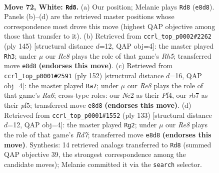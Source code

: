 \documentclass[11pt]{article}
\begin{document}
\clearpage

\begin{figure}[p]\centering
\begin{subfigure}{0.46\textwidth}\centering
\resizebox{\linewidth}{!}{%
\newchessgame
\chessboard[
  setfen={4R3/1r4bk/8/R7/2P5/8/2N3K1/8 w - - 64 72},
  showmover=false,
  pgfstyle=straightmove, color=movearrow, markmove={e8-d8}
]}
\caption{}
\end{subfigure}\hfill
\begin{subfigure}{0.46\textwidth}\centering
\resizebox{\linewidth}{!}{%
\newchessgame
\chessboard[
  setfen={8/8/8/1n2k3/7r/3KB3/R7/8 b - - 0 73},
  showmover=false,
  pgfstyle=straightmove, color=movearrow, markmove={h4-h3}
]}
\caption{}
\end{subfigure}
\\[4pt]
\begin{subfigure}{0.46\textwidth}\centering
\resizebox{\linewidth}{!}{%
\newchessgame
\chessboard[
  setfen={8/4bk2/R7/5p1K/5P2/8/8/8 w - - 46 77},
  showmover=false,
  pgfstyle=straightmove, color=movearrow, markmove={a6-a7}
]}
\caption{}
\end{subfigure}\hfill
\begin{subfigure}{0.46\textwidth}\centering
\resizebox{\linewidth}{!}{%
\newchessgame
\chessboard[
  setfen={8/5R2/8/4k1K1/6B1/1r6/3r4/8 b - - 5 67},
  showmover=false,
  pgfstyle=straightmove, color=movearrow, markmove={d2-g2}
]}
\caption{}
\end{subfigure}
\caption{\textbf{Move 72, White: \texttt{Rd8}.} (a) Our position; Melanie plays \texttt{Rd8} (\texttt{e8d8}). Panels (b)--(d) are the retrieved master positions whose correspondence most drove this move (highest QAP objective among those that transfer to it). (b) Retrieved from \texttt{ccrl\_top\_p0002\#2262} (ply 145) [structural distance $d$=12, QAP obj=4]: the master played \texttt{Rh3}; under $\mu$ our \emph{Re8} plays the role of that game's \emph{Rh5}; transferred move \texttt{e8d8} \textbf{(endorses this move)}. (c) Retrieved from \texttt{ccrl\_top\_p0001\#2591} (ply 152) [structural distance $d$=16, QAP obj=4]: the master played \texttt{Ra7}; under $\mu$ our \emph{Re8} plays the role of that game's \emph{Ra6}; cross-type roles: our \emph{N}c2 as their \emph{P}f4, our \emph{r}b7 as their \emph{p}f5; transferred move \texttt{e8d8} \textbf{(endorses this move)}. (d) Retrieved from \texttt{ccrl\_top\_p0001\#1552} (ply 133) [structural distance $d$=12, QAP obj=4]: the master played \texttt{Rg2}; under $\mu$ our \emph{Re8} plays the role of that game's \emph{Rd7}; transferred move \texttt{e8d8} \textbf{(endorses this move)}. Synthesis: 14 retrieved analogs transferred to \texttt{Rd8} (summed QAP objective 39, the strongest correspondence among the candidate moves); Melanie committed it via the \texttt{search} selector.}
\label{fig:thought-m142}
\end{figure}
\end{document}
